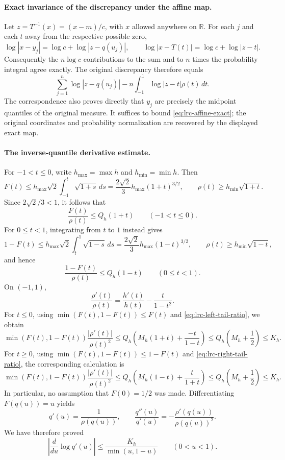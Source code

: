 \paragraph{Exact invariance of the discrepancy under the affine map.}
Let $z=T^{-1}(x)=(x-m)/c$, with $x$ allowed anywhere on $\mathbb R$.
For each $j$ and each $t$ away from the respective possible zero,
\[
 \log|x-y_j|=\log c+\log|z-q(u_j)|,
 \qquad
 \log|x-T(t)|=\log c+\log|z-t|.
\]
Consequently the $n\log c$ contributions to the sum and to $n$ times
the probability integral agree exactly. The original discrepancy
therefore equals
\begin{equation}\label{eq:lrc-affine-exact}
 \sum_{j=1}^n\log|z-q(u_j)|
   -n\int_{-1}^1\log|z-t|\rho(t)\,dt.
\end{equation}
The correspondence also proves directly that $y_j$ are precisely
the midpoint quantiles of the original measure. It suffices to
bound \eqref{eq:lrc-affine-exact}; the original coordinates and
probability normalization are recovered by the displayed exact map.

\paragraph{The inverse-quantile derivative estimate.}
For $-1<t\leq0$, write $h_{\max}=\max h$ and $h_{\min}=\min h$.
Then
\[
 F(t)
 \leq h_{\max}\sqrt2\int_{-1}^t\sqrt{1+s}\,ds
 =\frac{2\sqrt2}{3}h_{\max}(1+t)^{3/2},
 \qquad
 \rho(t)\geq h_{\min}\sqrt{1+t}.
\]
Since $2\sqrt2/3<1$, it follows that
\begin{equation}\label{eq:lrc-left-tail-ratio}
 \frac{F(t)}{\rho(t)}\leq Q_h(1+t)
 \qquad(-1<t\leq0).
\end{equation}
For $0\leq t<1$, integrating from $t$ to $1$ instead gives
\[
 1-F(t)
 \leq h_{\max}\sqrt2\int_t^1\sqrt{1-s}\,ds
 =\frac{2\sqrt2}{3}h_{\max}(1-t)^{3/2},
 \qquad \rho(t)\geq h_{\min}\sqrt{1-t},
\]
and hence
\begin{equation}\label{eq:lrc-right-tail-ratio}
 \frac{1-F(t)}{\rho(t)}\leq Q_h(1-t)
 \qquad(0\leq t<1).
\end{equation}
On $(-1,1)$,
\[
 \frac{\rho'(t)}{\rho(t)}
 =\frac{h'(t)}{h(t)}-\frac{t}{1-t^2}.
\]
For $t\leq0$, using $\min(F(t),1-F(t))\leq F(t)$ and
\eqref{eq:lrc-left-tail-ratio}, we obtain
\[
 \min(F(t),1-F(t))\frac{|\rho'(t)|}{\rho(t)^2}
 \leq Q_h\left(M_h(1+t)+\frac{-t}{1-t}\right)
 \leq Q_h\left(M_h+\frac12\right)\leq K_h.
\]
For $t\geq0$, using $\min(F(t),1-F(t))\leq1-F(t)$ and
\eqref{eq:lrc-right-tail-ratio}, the corresponding calculation is
\[
 \min(F(t),1-F(t))\frac{|\rho'(t)|}{\rho(t)^2}
 \leq Q_h\left(M_h(1-t)+\frac{t}{1+t}\right)
 \leq Q_h\left(M_h+\frac12\right)\leq K_h.
\]
In particular, no assumption that $F(0)=1/2$ was made. Differentiating
$F(q(u))=u$ yields
\[
 q'(u)=\frac1{\rho(q(u))},\qquad
 \frac{q''(u)}{q'(u)}
 =-\frac{\rho'(q(u))}{\rho(q(u))^2}.
\]
We have therefore proved
\begin{equation}\label{eq:lrc-log-derivative}
 \left|\frac{d}{du}\log q'(u)\right|
 \leq\frac{K_h}{\min(u,1-u)}\qquad(0<u<1).
\end{equation}

